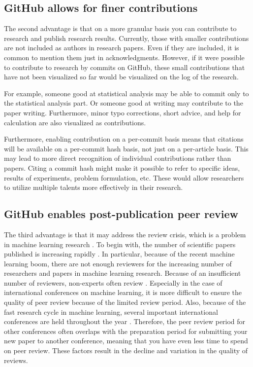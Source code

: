 \documentclass{article}
\begin{document}
\subsection{GitHub allows for finer contributions}
The second advantage is that on a more granular basis you can contribute to research and publish research results. Currently, those with smaller contributions are not included as authors in research papers. Even if they are included, it is common to mention them just in acknowledgments. However, if it were possible to contribute to research by commits on GitHub, these small contributions that have not been visualized so far would be visualized on the log of the research.

For example, someone good at statistical analysis may be able to commit only to the statistical analysis part. Or someone good at writing may contribute to the paper writing. Furthermore, minor typo corrections, short advice, and help for calculation are also visualized as contributions. 

Furthermore, enabling contribution on a per-commit basis means that citations will be available on a per-commit hash basis, not just on a per-article basis. This may lead to more direct recognition of individual contributions rather than papers. Citing a commit hash might make it possible to refer to specific ideas, results of experiments, problem formulation, etc. These would allow researchers to utilize multiple talents more effectively in their research.

\subsection{GitHub enables post-publication peer review}
The third advantage is that it may address the review crisis, which is a problem in machine learning research \cite{russo2021some}. To begin with, the number of scientific papers published is increasing rapidly \cite{bornmann2015growth}. In particular, because of the recent machine learning boom, there are not enough reviewers for the increasing number of researchers and papers in machine learning research. Because of an insufficient number of reviewers, non-experts often review \cite{russo2021some}. Especially in the case of international conferences on machine learning, it is more difficult to ensure the quality of peer review because of the limited review period. Also, because of the fast research cycle in machine learning, several important international conferences are held throughout the year \cite{deadlines}. Therefore, the peer review period for other conferences often overlaps with the preparation period for submitting your new paper to another conference, meaning that you have even less time to spend on peer review. These factors result in the decline and variation in the quality of reviews.
\end{document}
